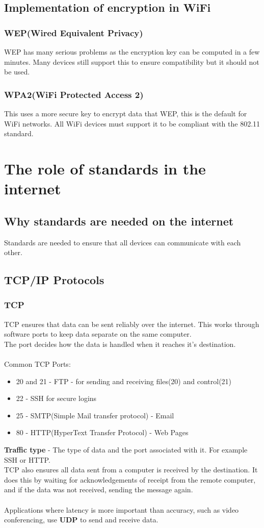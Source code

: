 \documentclass{article}[18pt]
\begin{document}
\subsection{Implementation of encryption in WiFi}
\subsubsection{WEP(Wired Equivalent Privacy)}
WEP has many serious problems as the encryption key can be computed in a few minutes. Many devices still support this to ensure compatibility but it should not be used.
\subsubsection{WPA2(WiFi Protected Access 2)}
This uses a more secure key to encrypt data that WEP, this is the default for WiFi networks. All WiFi devices must support it to be compliant with the 802.11 standard.
\section{The role of standards in the internet}
\subsection{Why standards are needed on the internet}
Standards are needed to ensure that all devices can communicate with each other.
\subsection{TCP/IP Protocols}
\subsubsection{TCP}
TCP ensures that data can be sent reliably over the internet. This works through software ports to keep data separate on the same computer.\\
The port decides how the data is handled when it reaches it's destination.\\
\\
Common TCP Ports:
\begin{itemize}
\item 20 and 21 - FTP - for sending and receiving files(20) and control(21)
\item 22 - SSH for secure logins
\item 25 - SMTP(Simple Mail transfer protocol) - Email
\item 80 - HTTP(HyperText Transfer Protocol) - Web Pages
\end{itemize}
\textbf{Traffic type} - The type of data and the port associated with it. For example SSH or HTTP.
\\
TCP also ensures all data sent from a computer is received by the destination. It does this by waiting for acknowledgements of receipt from the remote computer, and if the data was not received, sending the message again.\\
\\
Applications where latency is more important than accuracy, such as video conferencing, use \textbf{UDP} to send and receive data.
\end{document}
